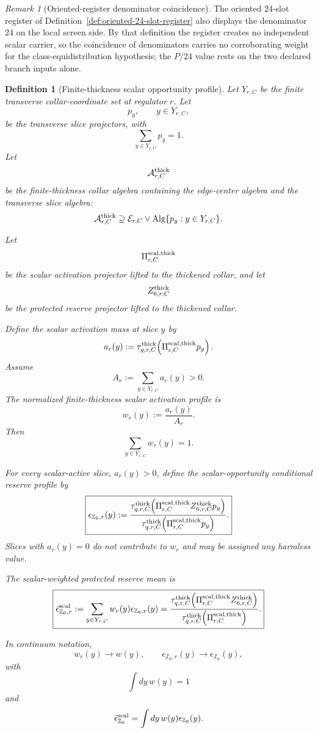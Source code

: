\documentclass[11pt]{article}
\newtheorem{definition}[theorem]{Definition}
\theoremstyle{remark}
\newtheorem{remark}[theorem]{Remark}
\theoremstyle{plain}
\begin{document}
\begin{remark}[Oriented-register denominator coincidence]
The oriented \(24\)-slot register of
Definition~\ref{def:oriented-24-slot-register} also displays the denominator
\(24\) on the local screen side. By that definition the register creates no
independent scalar carrier, so the coincidence of denominators carries no
corroborating weight for the class-equidistribution hypothesis; the \(P/24\)
value rests on the two declared branch inputs alone.
\end{remark}

\begin{definition}[Finite-thickness scalar opportunity profile]
\label{def:finite-thickness-scalar-profile}
Let \(Y_{r,C}\) be the finite transverse collar-coordinate set at regulator
\(r\). Let
\[
p_y,\qquad y\in Y_{r,C},
\]
be the transverse slice projectors, with
\[
\sum_{y\in Y_{r,C}}p_y=1.
\]
Let
\[
\mathcal A^{\rm thick}_{r,C}
\]
be the finite-thickness collar algebra containing the edge-center algebra and
the transverse slice algebra:
\[
\mathcal A^{\rm thick}_{r,C}
\supseteq
\mathcal E_{r,C}\vee \operatorname{Alg}\{p_y:y\in Y_{r,C}\}.
\]

Let
\[
\Pi^{\rm scal,thick}_{r,C}
\]
be the scalar activation projector lifted to the thickened collar, and let
\[
Z^{\rm thick}_{6,r,C}
\]
be the protected reserve projector lifted to the thickened collar.

Define the scalar activation mass at slice \(y\) by
\[
a_r(y)
:=
\tau^{\rm thick}_{q,r,C}
\!\left(\Pi^{\rm scal,thick}_{r,C}p_y\right).
\]
Assume
\[
A_r:=\sum_{y\in Y_{r,C}}a_r(y)>0.
\]
The normalized finite-thickness scalar activation profile is
\[
\boxed{
w_r(y):=\frac{a_r(y)}{A_r}.
}
\]
Then
\[
\sum_{y\in Y_{r,C}}w_r(y)=1.
\]

For every scalar-active slice, \(a_r(y)>0\), define the scalar-opportunity
conditional reserve profile by
\[
\boxed{
\epsilon_{\mathbb Z_6,r}(y)
:=
\frac{
\tau^{\rm thick}_{q,r,C}
\!\left(
\Pi^{\rm scal,thick}_{r,C}
Z^{\rm thick}_{6,r,C}
p_y
\right)
}{
\tau^{\rm thick}_{q,r,C}
\!\left(
\Pi^{\rm scal,thick}_{r,C}
p_y
\right)
}.
}
\]
Slices with \(a_r(y)=0\) do not contribute to \(w_r\) and may be assigned any
harmless value.

The scalar-weighted protected reserve mean is
\[
\boxed{
\bar\epsilon_{\mathbb Z_6,r}^{\rm scal}
:=
\sum_{y\in Y_{r,C}}w_r(y)\epsilon_{\mathbb Z_6,r}(y)
=
\frac{
\tau^{\rm thick}_{q,r,C}
\!\left(\Pi^{\rm scal,thick}_{r,C}Z^{\rm thick}_{6,r,C}\right)
}{
\tau^{\rm thick}_{q,r,C}
\!\left(\Pi^{\rm scal,thick}_{r,C}\right)
}.
}
\]

In continuum notation,
\[
w_r(y)\to w(y),
\qquad
\epsilon_{\mathbb Z_6,r}(y)\to\epsilon_{\mathbb Z_6}(y),
\]
with
\[
\int dy\,w(y)=1
\]
and
\[
\bar\epsilon_{\mathbb Z_6}^{\rm scal}
=
\int dy\,w(y)\epsilon_{\mathbb Z_6}(y).
\]
\end{definition}
\end{document}
